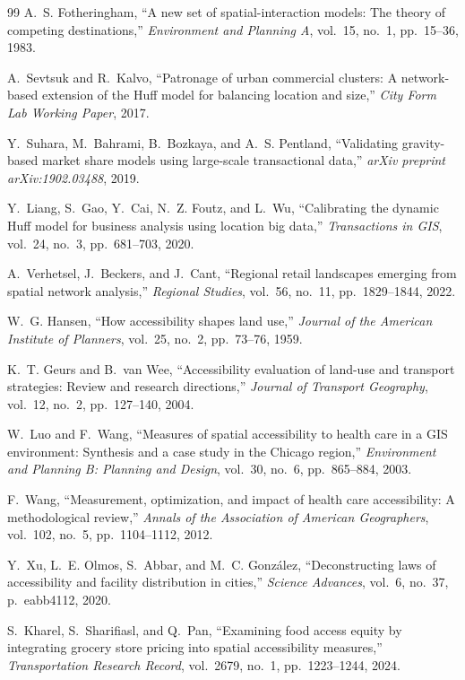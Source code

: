 \documentclass[conference]{IEEEtran}
\begin{document}
\begin{thebibliography}{99}
A.~S. Fotheringham, ``A new set of spatial-interaction models: The
theory of competing destinations,'' \textit{Environment and Planning A},
vol.~15, no.~1, pp.~15--36, 1983.

A.~Sevtsuk and R.~Kalvo, ``Patronage of urban commercial clusters: A
network-based extension of the Huff model for balancing location and
size,'' \textit{City Form Lab Working Paper}, 2017.

Y.~Suhara, M.~Bahrami, B.~Bozkaya, and A.~S. Pentland, ``Validating
gravity-based market share models using large-scale transactional
data,'' \textit{arXiv preprint arXiv:1902.03488}, 2019.

Y.~Liang, S.~Gao, Y.~Cai, N.~Z. Foutz, and L.~Wu, ``Calibrating the
dynamic Huff model for business analysis using location big data,''
\textit{Transactions in GIS}, vol.~24, no.~3, pp.~681--703, 2020.

A.~Verhetsel, J.~Beckers, and J.~Cant, ``Regional retail landscapes
emerging from spatial network analysis,'' \textit{Regional Studies},
vol.~56, no.~11, pp.~1829--1844, 2022.

W.~G. Hansen, ``How accessibility shapes land use,''
\textit{Journal of the American Institute of Planners}, vol.~25,
no.~2, pp.~73--76, 1959.

K.~T. Geurs and B.~van Wee, ``Accessibility evaluation of land-use and
transport strategies: Review and research directions,''
\textit{Journal of Transport Geography}, vol.~12, no.~2,
pp.~127--140, 2004.

W.~Luo and F.~Wang, ``Measures of spatial accessibility to health care
in a GIS environment: Synthesis and a case study in the Chicago
region,'' \textit{Environment and Planning B: Planning and Design},
vol.~30, no.~6, pp.~865--884, 2003.

F.~Wang, ``Measurement, optimization, and impact of health care
accessibility: A methodological review,'' \textit{Annals of the
Association of American Geographers}, vol.~102, no.~5,
pp.~1104--1112, 2012.

Y.~Xu, L.~E. Olmos, S.~Abbar, and M.~C. Gonz\'{a}lez,
``Deconstructing laws of accessibility and facility distribution in
cities,'' \textit{Science Advances}, vol.~6, no.~37, p.~eabb4112,
2020.

S.~Kharel, S.~Sharifiasl, and Q.~Pan, ``Examining food access equity by
integrating grocery store pricing into spatial accessibility measures,''
\textit{Transportation Research Record}, vol.~2679, no.~1,
pp.~1223--1244, 2024.


\end{thebibliography}
\end{document}
